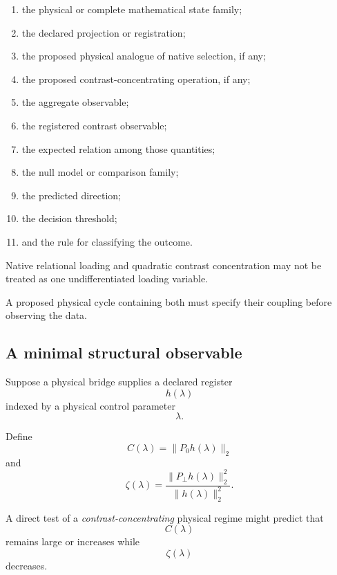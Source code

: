 \begin{enumerate}[label=(\roman*)]

\item the physical or complete mathematical state family;

\item the declared projection or registration;

\item the proposed physical analogue of native selection, if any;

\item the proposed contrast-concentrating operation, if any;

\item the aggregate observable;

\item the registered contrast observable;

\item the expected relation among those quantities;

\item the null model or comparison family;

\item the predicted direction;

\item the decision threshold;

\item and the rule for classifying the outcome.

\end{enumerate}

Native relational loading and quadratic contrast concentration may not
be treated as one undifferentiated loading variable.

A proposed physical cycle containing both must specify their coupling
before observing the data.

\subsection{A minimal structural observable}


Suppose a physical bridge supplies a declared register
\[
h(\lambda)
\]
indexed by a physical control parameter
\[
\lambda.
\]

Define
\[
C(\lambda)=\|P_0h(\lambda)\|_2
\]
and
\[
\zeta(\lambda)
=
\frac{\|P_\perp h(\lambda)\|_2^2}
{\|h(\lambda)\|_2^2}.
\]

A direct test of a \emph{contrast-concentrating} physical regime might
predict that
\[
C(\lambda)
\]
remains large or increases while
\[
\zeta(\lambda)
\]
decreases.

